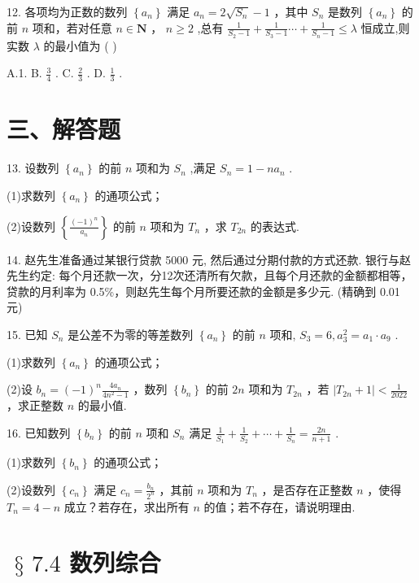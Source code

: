 12. 各项均为正数的数列 $\left\{  {a}_{n}\right\}$ 满足 ${a}_{n} = 2\sqrt{{S}_{n}} - 1$ ，其中 ${S}_{n}$ 是数列 $\left\{  {a}_{n}\right\}$ 的前 $n$ 项和，若对任意 $n \in  \mathbf{N}$ ， $n \geq  2$ ,总有 $\frac{1}{{S}_{2} - 1} + \frac{1}{{S}_{3} - 1}\cdots  + \frac{1}{{S}_{n} - 1} \leq  \lambda$ 恒成立,则实数 $\lambda$ 的最小值为 ( )

A.1. B. $\frac{3}{4}$ . C. $\frac{2}{3}$ . D. $\frac{1}{3}$ .

\section*{三、解答题}

13. 设数列 $\left\{  {a}_{n}\right\}$ 的前 $n$ 项和为 ${S}_{n}$ ,满足 ${S}_{n} = 1 - n{a}_{n}$ .

(1)求数列 $\left\{  {a}_{n}\right\}$ 的通项公式；

(2)设数列 $\left\{  \frac{{\left( -1\right) }^{n}}{{a}_{n}}\right\}$ 的前 $n$ 项和为 ${T}_{n}$ ，求 ${T}_{2n}$ 的表达式.

14. 赵先生准备通过某银行贷款 5000 元, 然后通过分期付款的方式还款. 银行与赵先生约定: 每个月还款一次，分12次还清所有欠款，且每个月还款的金额都相等，贷款的月利率为 0.5\%，则赵先生每个月所要还款的金额是多少元. (精确到 0.01 元)

15. 已知 ${S}_{n}$ 是公差不为零的等差数列 $\left\{  {a}_{n}\right\}$ 的前 $n$ 项和, ${S}_{3} = 6,{a}_{3}^{2} = {a}_{1} \cdot  {a}_{9}$ .

(1)求数列 $\left\{  {a}_{n}\right\}$ 的通项公式；

(2)设 ${b}_{n} = {\left( -1\right) }^{n}\frac{4{a}_{n}}{4{n}^{2} - 1}$ ，数列 $\left\{  {b}_{n}\right\}$ 的前 ${2n}$ 项和为 ${T}_{2n}$ ，若 $\left| {{T}_{2n} + 1}\right|  < \frac{1}{2022}$ ，求正整数 $n$ 的最小值.

16. 已知数列 $\left\{  {b}_{n}\right\}$ 的前 $n$ 项和 ${S}_{n}$ 满足 $\frac{1}{{S}_{1}} + \frac{1}{{S}_{2}} + \cdots  + \frac{1}{{S}_{n}} = \frac{2n}{n + 1}$ .

(1)求数列 $\left\{  {b}_{n}\right\}$ 的通项公式；

(2)设数列 $\left\{  {c}_{n}\right\}$ 满足 ${c}_{n} = \frac{{b}_{n}}{{2}^{n}}$ ，其前 $n$ 项和为 ${T}_{n}$ ，是否存在正整数 $n$ ，使得 ${T}_{n} = 4 - n$ 成立？若存在，求出所有 $n$ 的值；若不存在，请说明理由.

\section*{$\text{ § }{7.4}$ 数列综合}

